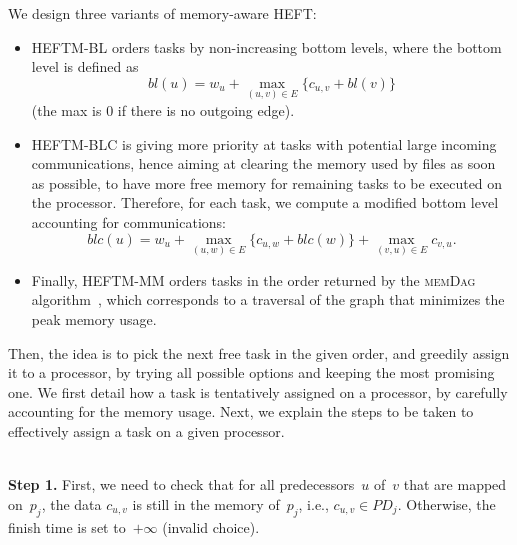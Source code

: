 \documentclass[conference]{IEEEtran}
\newcommand{\algo}[1]{\textsc{#1}}
\newcommand{\skug}[1]{{\color{blue}[SK: #1]}}
\begin{document}
\smallskip

We design three variants of memory-aware HEFT:
\begin{itemize}
\item    HEFTM-BL orders tasks by non-increasing bottom levels, where the bottom
    level is defined as
    $$bl(u) = w_u + \max_{(u,v)\in E} \{c_{u,v} + bl(v)\}$$
    (the max is 0 if there is no outgoing edge).

\item    HEFTM-BLC %
    is  giving more priority at tasks with potential large incoming communications,
    hence aiming at clearing the memory used by files as soon as possible,
    to have more free memory for remaining tasks to be executed on the processor.
    Therefore, for each task, we compute a modified bottom level accounting for communications:
    $$blc(u) = w_u + \max_{(u,w)\in E} \{c_{u,w} + blc(w)\} + \max_{(v,u)\in E} c_{v,u}   . $$


\item   Finally, HEFTM-MM orders tasks  in the order returned by %
the  \algo{memDag} algorithm~\cite{KAYAASLAN20181}, which corresponds to a traversal
of the graph that minimizes the peak memory usage.

\end{itemize}

\smallskip

    Then, the idea is to pick the next free task in the given order,
    and greedily assign it to a processor, by trying all possible options
    and keeping the most promising one. We first detail how a task
    is tentatively assigned on a processor, by carefully accounting for the memory usage.
    Next, we explain the steps to be taken to effectively assign a task on a given processor.

    \medskip
    \\
    {\bf Step 1.} First, we need to check that for all predecessors~$u$ of~$v$ that are mapped
    on~$p_j$, the data $c_{u,v}$ is still in the memory of~$p_j$,
    i.e., $c_{u,v}\in PD_j$. Otherwise, the finish time is set to~$+\infty$ (invalid choice).
\end{document}
